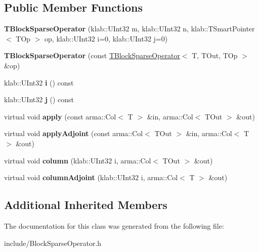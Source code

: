\subsection*{Public Member Functions}
\begin{DoxyCompactItemize}
\item 
{\bfseries T\+Block\+Sparse\+Operator} (klab\+::\+U\+Int32 m, klab\+::\+U\+Int32 n, klab\+::\+T\+Smart\+Pointer$<$ T\+Op $>$ op, klab\+::\+U\+Int32 i=0, klab\+::\+U\+Int32 j=0)\hypertarget{classkl1p_1_1TBlockSparseOperator_af0c2a5bd04d2148f411eea28e14ceef4}{}\label{classkl1p_1_1TBlockSparseOperator_af0c2a5bd04d2148f411eea28e14ceef4}

\item 
{\bfseries T\+Block\+Sparse\+Operator} (const \hyperlink{classkl1p_1_1TBlockSparseOperator}{T\+Block\+Sparse\+Operator}$<$ T, T\+Out, T\+Op $>$ \&op)\hypertarget{classkl1p_1_1TBlockSparseOperator_acbc282b128a473bb7d6089a2e77e446c}{}\label{classkl1p_1_1TBlockSparseOperator_acbc282b128a473bb7d6089a2e77e446c}

\item 
klab\+::\+U\+Int32 {\bfseries i} () const \hypertarget{classkl1p_1_1TBlockSparseOperator_ac4432fa617c2d193eb8ef0c1edb1381c}{}\label{classkl1p_1_1TBlockSparseOperator_ac4432fa617c2d193eb8ef0c1edb1381c}

\item 
klab\+::\+U\+Int32 {\bfseries j} () const \hypertarget{classkl1p_1_1TBlockSparseOperator_a49c572c0c9050c4347e0afbed5565326}{}\label{classkl1p_1_1TBlockSparseOperator_a49c572c0c9050c4347e0afbed5565326}

\item 
virtual void {\bfseries apply} (const arma\+::\+Col$<$ T $>$ \&in, arma\+::\+Col$<$ T\+Out $>$ \&out)\hypertarget{classkl1p_1_1TBlockSparseOperator_ada3066cb198b324d18b5d05ccd5117bc}{}\label{classkl1p_1_1TBlockSparseOperator_ada3066cb198b324d18b5d05ccd5117bc}

\item 
virtual void {\bfseries apply\+Adjoint} (const arma\+::\+Col$<$ T\+Out $>$ \&in, arma\+::\+Col$<$ T $>$ \&out)\hypertarget{classkl1p_1_1TBlockSparseOperator_a18e3069fd6392329c031d650c368914d}{}\label{classkl1p_1_1TBlockSparseOperator_a18e3069fd6392329c031d650c368914d}

\item 
virtual void {\bfseries column} (klab\+::\+U\+Int32 i, arma\+::\+Col$<$ T\+Out $>$ \&out)\hypertarget{classkl1p_1_1TBlockSparseOperator_ac5bb115aa4b1e002b5f3a5751b6674aa}{}\label{classkl1p_1_1TBlockSparseOperator_ac5bb115aa4b1e002b5f3a5751b6674aa}

\item 
virtual void {\bfseries column\+Adjoint} (klab\+::\+U\+Int32 i, arma\+::\+Col$<$ T $>$ \&out)\hypertarget{classkl1p_1_1TBlockSparseOperator_a7c4adcf2d38ce4d11b9d054aef743769}{}\label{classkl1p_1_1TBlockSparseOperator_a7c4adcf2d38ce4d11b9d054aef743769}

\end{DoxyCompactItemize}
\subsection*{Additional Inherited Members}


The documentation for this class was generated from the following file\+:\begin{DoxyCompactItemize}
\item 
include/Block\+Sparse\+Operator.\+h\end{DoxyCompactItemize}
